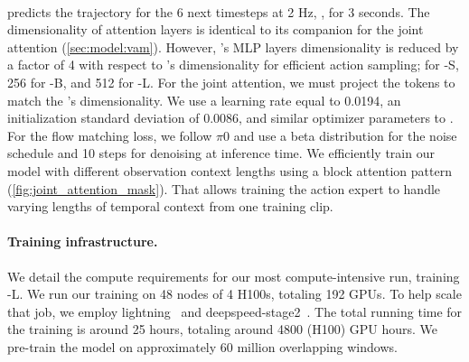 \paragraph{\vam} predicts the trajectory for the 6 next timesteps at 2 Hz, \ie, for 3 seconds. The dimensionality of \vam attention layers is identical to its \vm companion for the joint attention (\autoref{sec:model:vam}). However, \vam's MLP layers dimensionality is reduced by a factor of 4 with respect to \vm's dimensionality for efficient action sampling;  for \vam-S, 256 for \vam-B, and 512 for \vm-L. For the joint attention, we must project the tokens to match the \vm's dimensionality. We use a learning rate equal to 0.0194, an initialization standard deviation of 0.0086, and similar optimizer parameters to \vm{}. For the flow matching loss, we follow $\pi0$ and use a beta distribution for the noise schedule and 10 steps for denoising at inference time. We efficiently train our model with different observation context lengths using a block attention pattern (\autoref{fig:joint_attention_mask}). That allows training the action expert to handle varying lengths of temporal context from one training clip.

\paragraph{Training infrastructure.} We detail the compute requirements for our most compute-intensive run, training \vm-L. We run our training on 48 nodes of 4 H100s, totaling 192 GPUs. To help scale that job, we employ lightning~\cite{Falcon_PyTorch_Lightning_2019} and deepspeed-stage2~\cite{deepspeed}. The total running time for the training is around 25 hours, totaling around 4800 (H100) GPU hours. We pre-train the model on approximately 60 million overlapping windows.
